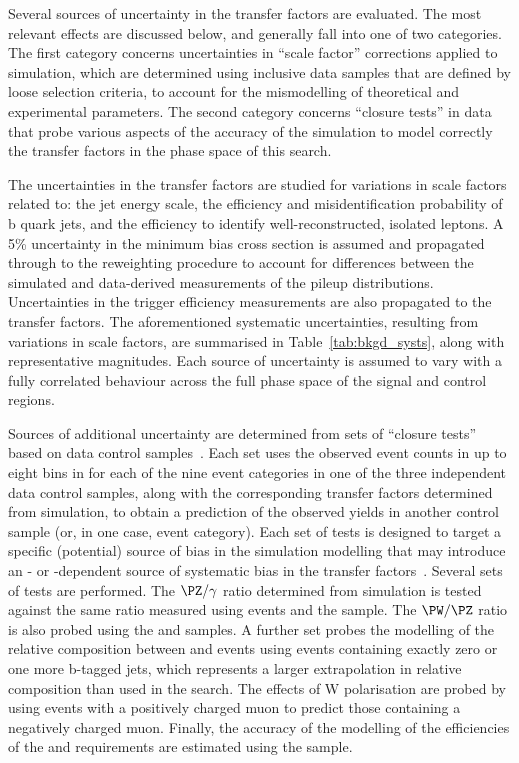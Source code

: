 Several sources of uncertainty in the transfer factors are evaluated.
The most relevant effects are discussed below, and generally fall into
one of two categories. The first category concerns uncertainties in
``scale factor'' corrections applied to simulation, which are
determined using inclusive data samples that are defined by loose
selection criteria, to account for the mismodelling of theoretical and
experimental parameters. The second category concerns ``closure
tests'' in data that probe various aspects of the accuracy of the
simulation to model correctly the transfer factors in the phase space
of this search.

The uncertainties in the transfer factors are studied for variations
in scale factors related to: the jet energy scale, the efficiency and
misidentification probability of b quark jets, and the efficiency to
identify well-reconstructed, isolated leptons. A 5\% uncertainty in
the minimum bias cross section is assumed and propagated through to
the reweighting procedure to account for differences between the
simulated and data-derived measurements of the pileup distributions.
Uncertainties in the trigger efficiency measurements are also
propagated to the transfer factors. 
The aforementioned systematic uncertainties, resulting from variations
in scale factors, are summarised in Table~\ref{tab:bkgd_systs}, along
with representative magnitudes.  Each source of uncertainty is assumed
to vary with a fully correlated behaviour across the full phase space
of the signal and control regions.

Sources of additional uncertainty are determined from sets of
``closure tests'' based on data control
samples~\cite{RA1Paper2012}. Each set uses the observed event counts
in up to eight bins in \scalht for each of the nine \njet event
categories in one of the three independent data control samples, along
with the corresponding transfer factors determined from simulation, to
obtain a prediction of the observed yields in another control sample
(or, in one case, \nb event category). 
Each set of tests is designed to target a specific (potential) source
of bias in the simulation modelling that may introduce an \njet- or
\scalht-dependent source of systematic bias in the transfer
factors~\cite{RA1Paper2012}. Several sets of tests are performed. The
$\PZ/\gamma$ ratio determined from simulation is tested against the
same ratio measured using \zmmj events and the \gj sample. The
$\PW/\PZ$ ratio is also probed using the \mj and \mmj samples. A
further set probes the modelling of the relative composition between
\wlj and \ttbar events using \mj events containing exactly zero or one
more b-tagged jets, which represents a larger extrapolation in
relative composition than used in the search.  The effects of W
polarisation are probed by using \mj events with a positively charged
muon to predict those containing a negatively charged muon. Finally,
the accuracy of the modelling of the efficiencies of the \alphat and
\bdphi requirements are estimated using the \mj sample.

